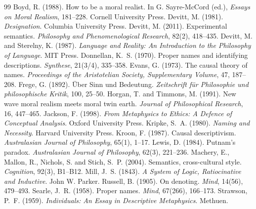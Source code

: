 \documentclass{situationist-preprint}
\begin{document}
\begin{thebibliography}{99}\small
{} Boyd, R. (1988). How to be a moral realist. In G. Sayre-McCord (ed.), \emph{Essays on Moral Realism}, 181--228. Cornell University Press.
 Devitt, M. (1981). \emph{Designation}. Columbia University Press.
 Devitt, M. (2011). Experimental semantics. \emph{Philosophy and Phenomenological Research}, 82(2), 418--435.
 Devitt, M. and Sterelny, K. (1987). \emph{Language and Reality: An Introduction to the Philosophy of Language}. MIT Press.
 Donnellan, K.~S. (1970). Proper names and identifying descriptions. \emph{Synthese}, 21(3/4), 335--358.
 Evans, G. (1973). The causal theory of names. \emph{Proceedings of the Aristotelian Society, Supplementary Volume}, 47, 187--208.
 Frege, G. (1892). \"Uber Sinn und Bedeutung. \emph{Zeitschrift f\"ur Philosophie und philosophische Kritik}, 100, 25--50.
 Horgan, T. and Timmons, M. (1991). New wave moral realism meets moral twin earth. \emph{Journal of Philosophical Research}, 16, 447--465.
 Jackson, F. (1998). \emph{From Metaphysics to Ethics: A Defence of Conceptual Analysis}. Oxford University Press.
 Kripke, S.~A. (1980). \emph{Naming and Necessity}. Harvard University Press.
 Kroon, F. (1987). Causal descriptivism. \emph{Australasian Journal of Philosophy}, 65(1), 1--17.
 Lewis, D. (1984). Putnam's paradox. \emph{Australasian Journal of Philosophy}, 62(3), 221--236.
 Machery, E., Mallon, R., Nichols, S. and Stich, S.~P. (2004). Semantics, cross-cultural style. \emph{Cognition}, 92(3), B1--B12.
 Mill, J.~S. (1843). \emph{A System of Logic, Ratiocinative and Inductive}. John W. Parker.
 Russell, B. (1905). On denoting. \emph{Mind}, 14(56), 479--493.
 Searle, J.~R. (1958). Proper names. \emph{Mind}, 67(266), 166--173.
 Strawson, P.~F. (1959). \emph{Individuals: An Essay in Descriptive Metaphysics}. Methuen.
\end{thebibliography}
\end{document}
